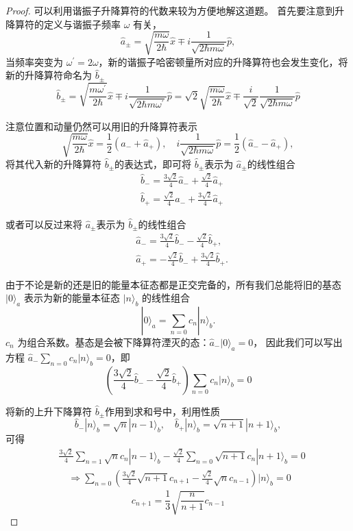 \begin{proof}
    可以利用谐振子升降算符的代数来较为方便地解这道题。
首先要注意到升降算符的定义与谐振子频率 $\omega$ 有关，
\[\hat{a}_{ \pm}=\sqrt{\frac{m \omega}{2 \hbar}} \hat{x} \mp i \frac{1}{\sqrt{2 \hbar m \omega}} \hat{p},\]
当频率突变为 $\omega^{\prime}=2 \omega$，新的谐振子哈密顿量所对应的升降算符也会发生变化，将新的升降算符命名为 $\hat{b}_{ \pm}$
$$\hat{b}_{ \pm}=\sqrt{\frac{m \omega^{\prime}}{2 \hbar}} \hat{x} \mp i \frac{1}{\sqrt{2 \hbar m \omega^{\prime}}} \hat{p}
=\sqrt{2} \sqrt{\frac{m \omega}{2 \hbar}} \hat{x} \mp \frac{i}{\sqrt{2}} \frac{1}{\sqrt{2 \hbar m \omega}} \hat{p}$$

注意位置和动量仍然可以用旧的升降算符表示 
\[\sqrt{\frac{m \omega}{2 \hbar}} \hat{x}=\frac{1}{2}\left(\hat{a}_{-}+\hat{a}_{+}\right), 
\quad i \frac{1}{\sqrt{2 \hbar m \omega}} \hat{p}=\frac{1}{2}\left(\hat{a}_{-}-\hat{a}_{+}\right),\]
将其代入新的升降算符 $\hat{b}_{ \pm}$的表达式，即可将 $\hat{b}_{ \pm}$表示为 $\hat{a}_{ \pm}$的线性组合
$$
\begin{aligned}
& \hat{b}_{-}=\frac{3 \sqrt{2}}{4} \hat{a}_{-}+\frac{\sqrt{2}}{4} \hat{a}_{+} \\
& \hat{b}_{+}=\frac{\sqrt{2}}{4} \hat{a}_{-}+\frac{3 \sqrt{2}}{4} \hat{a}_{+}
\end{aligned}
$$

或者可以反过来将 $\hat{a}_{ \pm}$表示为 $\hat{b}_{ \pm}$的线性组合
$$
\begin{aligned}
& \hat{a}_{-}=\frac{3 \sqrt{2}}{4} \hat{b}_{-}-\frac{\sqrt{2}}{4} \hat{b}_{+}, \\
& \hat{a}_{+}=-\frac{\sqrt{2}}{4} \hat{b}_{-}+\frac{3 \sqrt{2}}{4} \hat{b}_{+} .
\end{aligned}
$$

由于不论是新的还是旧的能量本征态都是正交完备的，所有我们总能将旧的基态 $|0\rangle_{a}$ 表示为新的能量本征态 $|n\rangle_{b}$ 的线性组合
$$|0\rangle_{a}=\sum_{n=0} c_{n}|n\rangle_{b}.$$
$c_{n}$ 为组合系数。基态是会被下降算符湮灭的态：$\hat{a}_{-}|0\rangle_{a}=0$，
因此我们可以写出方程 $\hat{a}_{-} \sum_{n=0} c_{n}|n\rangle_{b}=0$，即
$$\left(\frac{3 \sqrt{2}}{4} \hat{b}_{-}-\frac{\sqrt{2}}{4} \hat{b}_{+}\right) \sum_{n=0} c_{n}|n\rangle_{b}=0$$

将新的上升下降算符 $\hat{b}_{ \pm}$作用到求和号中，利用性质
\[\hat{b}_{-}|n\rangle_{b}=\sqrt{n}|n-1\rangle_{b}, 
\quad \hat{b}_{+}|n\rangle_{b}=\sqrt{n+1}|n+1\rangle_{b},\]
可得
$$
\begin{aligned}
& \frac{3 \sqrt{2}}{4} \sum_{n=1} \sqrt{n} c_{n}|n-1\rangle_{b}-\frac{\sqrt{2}}{4} \sum_{n=0} \sqrt{n+1} c_{n}|n+1\rangle_{b}=0 \\
& \quad \Rightarrow \sum_{n=0}\left(\frac{3 \sqrt{2}}{4} \sqrt{n+1} c_{n+1}-\frac{\sqrt{2}}{4} \sqrt{n} c_{n-1}\right)|n\rangle_{b}=0
\end{aligned}
$$
$$c_{n+1}=\frac{1}{3} \sqrt{\frac{n}{n+1}} c_{n-1}$$


\end{proof}
